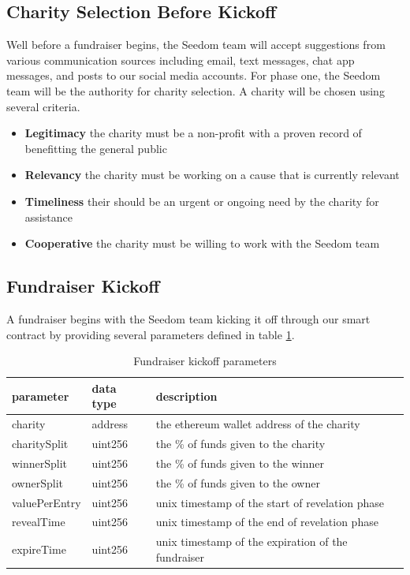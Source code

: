 \documentclass[11pt]{article}
\begin{document}
\subsection{Charity Selection Before Kickoff}

Well before a fundraiser begins, the Seedom team will accept suggestions from various communication sources including email, text messages, chat app messages, and posts to our social media accounts. For phase one, the Seedom team will be the authority for charity selection. A charity will be chosen using several criteria.

\begin{itemize}
\item{\textbf{Legitimacy} the charity must be a non-profit with a proven record of benefitting the general public}
\item{\textbf{Relevancy} the charity must be working on a cause that is currently relevant}
\item{\textbf{Timeliness} their should be an urgent or ongoing need by the charity for assistance}
\item{\textbf{Cooperative} the charity must be willing to work with the Seedom team}
\end{itemize}

\subsection{Fundraiser Kickoff}
A fundraiser begins with the Seedom team kicking it off through our smart contract by providing several parameters defined in table \ref{tab:fundraiserKickoffParameters}.

\begin{table}[!htb]
\begin{center}
\begin{tabular}{| l | l | l |}
\hline
\textbf{parameter} & \textbf{data type} & \textbf{description} \\ \hline
charity & address & the ethereum wallet address of the charity \\ \hline
charitySplit & uint256 & the \% of funds given to the charity \\ \hline
winnerSplit & uint256 & the \% of funds given to the winner \\ \hline
ownerSplit & uint256 & the \% of funds given to the owner \\ \hline
valuePerEntry & uint256 & unix timestamp of the start of revelation phase \\ \hline
revealTime & uint256 & unix timestamp of the end of revelation phase \\ \hline
expireTime & uint256 & unix timestamp of the expiration of the fundraiser \\ \hline
\end{tabular}
\caption{Fundraiser kickoff parameters}
\label{tab:fundraiserKickoffParameters}
\end{center}
\end{table}
\end{document}
